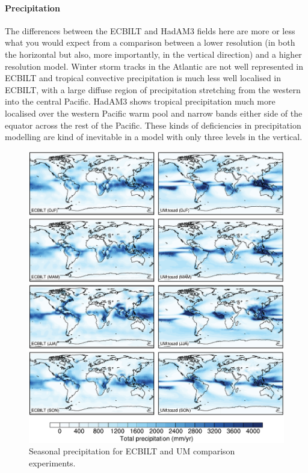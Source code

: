 \documentclass[a4paper,11pt,article]{article}
\begin{document}
\paragraph{Precipitation}

The differences between the ECBILT and HadAM3 fields here are more or
less what you would expect from a comparison between a lower
resolution (in both the horizontal but also, more importantly, in the
vertical direction) and a higher resolution model.  Winter storm
tracks in the Atlantic are not well represented in ECBILT and tropical
convective precipitation is much less well localised in ECBILT, with a
large diffuse region of precipitation stretching from the western into
the central Pacific.  HadAM3 shows tropical precipitation much more
localised over the western Pacific warm pool and narrow bands either
side of the equator across the rest of the Pacific.  These kinds of
deficiencies in precipitation modelling are kind of inevitable in a
model with only three levels in the vertical.

\begin{figure}
  \begin{center}
    \includegraphics[width=\textwidth]{../expt-1/plots/pp-plots}
  \end{center}
  \caption{Seasonal precipitation for ECBILT and UM comparison
    experiments.}
  \label{fig:pp}
\end{figure}
\end{document}

